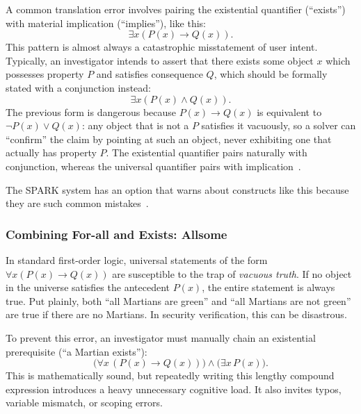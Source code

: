 A common translation error involves pairing the existential quantifier (``exists'') with material implication (``implies''), like this:
\[ \exists x (P(x) \rightarrow Q(x)). \]
This pattern is almost always a catastrophic misstatement of user intent. Typically, an investigator intends to assert that there exists some object $x$ which possesses property $P$ and satisfies consequence $Q$, which should be formally stated with a conjunction instead:
\[ \exists x (P(x) \land Q(x)). \]
The previous form is dangerous because $P(x) \rightarrow Q(x)$ is equivalent to $\neg P(x) \lor Q(x)$: any object that is not a $P$ satisfies it vacuously, so a solver can ``confirm'' the claim by pointing at such an object, never exhibiting one that actually has property $P$. The existential quantifier pairs naturally with conjunction, whereas the universal quantifier pairs with implication~\cite{barwise2011lpl}.

The SPARK system has an option that warns about constructs like this because they are such common mistakes~\cite{wheeler2026allsome}.

\subsubsection{Combining For-all and Exists: Allsome}

In standard first-order logic, universal statements of the form $\forall x (P(x) \rightarrow Q(x))$ are susceptible to the trap of \emph{vacuous truth}. If no object in the universe satisfies the antecedent $P(x)$, the entire statement is always true. Put plainly, both ``all Martians are green'' and ``all Martians are not green'' are true if there are no Martians. In security verification, this can be disastrous.

To prevent this error, an investigator must manually chain an existential prerequisite (``a Martian exists''):
\[\bigl(\forall x \, (P(x) \rightarrow Q(x))\bigr) \land \bigl(\exists x \, P(x)\bigr).\]
This is mathematically sound, but repeatedly writing this lengthy compound expression introduces a heavy unnecessary cognitive load. It also invites typos, variable mismatch, or scoping errors.

